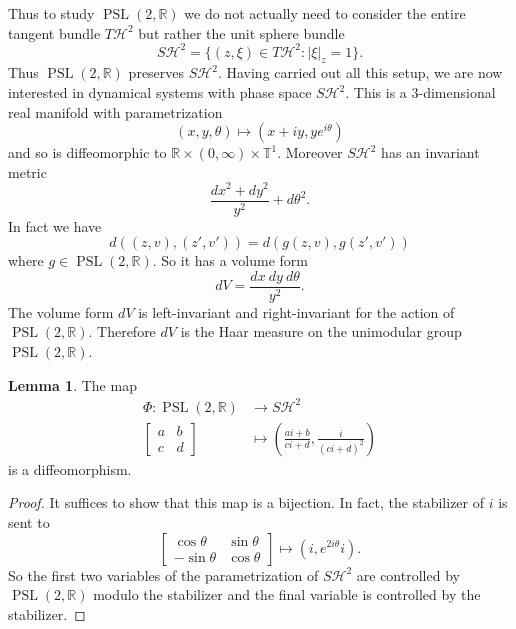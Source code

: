 \documentclass[12pt]{report}
\newcommand{\RR}{\mathbb{R}}
\newcommand{\TT}{\mathbb{T}}
\newcommand{\HH}{\mathcal H}
\newcommand{\PSL}{\operatorname{PSL}}
\theoremstyle{definition}
\newtheorem{lemma}[theorem]{Lemma}
\begin{document}
Thus to study $\PSL(2, \RR)$ we do not actually need to consider the entire tangent bundle $T\HH^2$ but rather the unit sphere bundle
$$S\HH^2 = \{(z, \xi) \in T\HH^2: |\xi|_z = 1\}.$$
Thus $\PSL(2, \RR)$ preserves $S\HH^2$.
Having carried out all this setup, we are now interested in dynamical systems with phase space $S\HH^2$.
This is a $3$-dimensional real manifold with parametrization
$$(x, y, \theta) \mapsto (x + iy, ye^{i\theta})$$
and so is diffeomorphic to $\RR \times (0, \infty) \times \TT^1$.
Moreover $S\HH^2$ has an invariant metric
$$\frac{dx^2 + dy^2}{y^2} + d\theta^2.$$
In fact we have
$$d((z, v), (z', v')) = d(g(z, v), g(z', v'))$$
where $g \in \PSL(2, \RR)$.
So it has a volume form
$$dV = \frac{dx~dy~d\theta}{y^2}.$$
The volume form $dV$ is left-invariant and right-invariant for the action of $\PSL(2, \RR)$.
Therefore $dV$ is the Haar measure on the unimodular group $\PSL(2, \RR)$.

\begin{lemma}
The map
\begin{align*}
\Phi: \PSL(2, \RR) &\to S\HH^2\\
\begin{bmatrix}a&b\\
c&d\end{bmatrix} &\mapsto \left(\frac{ai + b}{ci + d}, \frac{i}{(ci + d)^2}\right)
\end{align*}
is a diffeomorphism.
\end{lemma}
\begin{proof}
It suffices to show that this map is a bijection. In fact, the stabilizer of $i$ is sent to
$$\begin{bmatrix}\cos \theta & \sin \theta\\-\sin \theta & \cos \theta\end{bmatrix} \mapsto (i, e^{2i\theta}i).$$
So the first two variables of the parametrization of $S\HH^2$ are controlled by $\PSL(2, \RR)$ modulo the stabilizer and the final variable is controlled by the stabilizer.
\end{proof}
\end{document}

